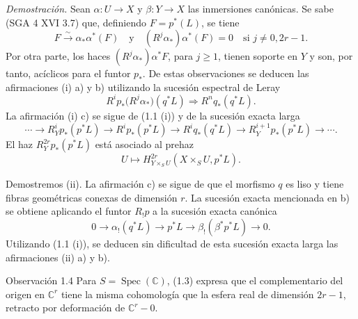 \emph{Demostración.} Sean $\alpha:U\to X$ y $\beta:Y\to X$ las inmersiones canónicas. Se sabe (SGA 4 XVI 3.7) que, definiendo $F=p^*(L)$, se tiene
\[
F\xrightarrow{\sim}\alpha_*\alpha^*(F)
\quad\text{y}\quad
(R^j\alpha_*)\alpha^*(F)=0\quad\text{si }j\ne0,2r-1.
\]
Por otra parte, los haces $(R^j\alpha_*)\alpha^*F$, para $j\ge1$, tienen soporte en $Y$ y son, por tanto, acíclicos para el funtor $p_*$. De estas observaciones se deducen las afirmaciones (i) a) y b) utilizando la sucesión espectral de Leray
\[
R^i p_*\bigl(R^j\alpha_*\bigr)(q^*L)\Longrightarrow R^n q_*(q^*L).
\]
La afirmación (i) c) se sigue de (1.1 (i)) y de la sucesión exacta larga
\[
\cdots\longrightarrow R_Y^i p_*(p^*L)\longrightarrow R^i p_*(p^*L)\longrightarrow R^i q_*(q^*L)
\longrightarrow R_Y^{i+1}p_*(p^*L)\longrightarrow\cdots.
\]
El haz $R_Y^{2r}p_*(p^*L)$ está asociado al prehaz
\[
U\longmapsto H^{2r}_{Y\times_S U}(X\times_S U,p^*L).
\]

Demostremos (ii). La afirmación c) se sigue de que el morfismo $q$ es liso y tiene fibras geométricas conexas de dimensión $r$. La sucesión exacta mencionada en b) se obtiene aplicando el funtor $R_!p$ a la sucesión exacta canónica
\[
0\longrightarrow \alpha_!(q^*L)\longrightarrow p^*L\longrightarrow \beta_!(\beta^*p^*L)\longrightarrow 0.
\]
Utilizando (1.1 (i)), se deducen sin dificultad de esta sucesión exacta larga las afirmaciones (ii) a) y b).

\begin{statement}{Observación 1.4}
Para $S=\operatorname{Spec}(\mathbb C)$, (1.3) expresa que el complementario del origen en $\mathbb C^r$ tiene la misma cohomología que la esfera real de dimensión $2r-1$, retracto por deformación de $\mathbb C^r-0$.
\end{statement}
